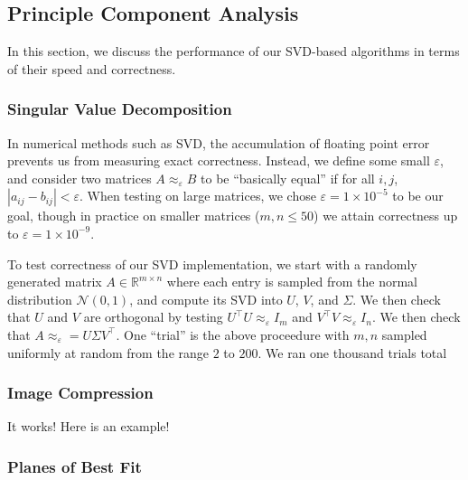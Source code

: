 \documentclass[12pt, letterpaper]{article}
\theoremstyle{definition}
\theoremstyle{remark}
\newcommand{\R}{\mathbb{R}}
\begin{document}
\subsection{Principle Component Analysis}

In this section, we discuss the performance of our SVD-based algorithms in terms 
of their speed and correctness.

\subsubsection{Singular Value Decomposition}

In numerical methods such as SVD, the accumulation of floating point error prevents us from measuring exact correctness.
Instead, we define some small $\varepsilon$, and consider two matrices $A \approx_\varepsilon B$ to be ``basically equal'' if 
for all $i, j$, $|a_{ij} - b_{ij}| < \varepsilon$. When testing on large matrices, we chose $\varepsilon = 1 \times 10^{-5}$
to be our goal, though in practice on smaller matrices ($m, n \leq 50$) we attain correctness up to $\varepsilon = 1 \times 10^{-9}$.

To test correctness of our SVD implementation, we start with a randomly generated matrix $A \in \R^{m \times n}$
where each entry is sampled from the normal distribution $\mathcal N(0, 1)$, and compute its SVD into $U$, $V$, 
and $\Sigma$. We then check that $U$ and $V$ are orthogonal by testing $U^\top U \approx_\varepsilon I_m$ 
and $V^\top V \approx_\varepsilon I_n$. We then check that $A \approx_\varepsilon = U \Sigma V^\top$. One ``trial'' is 
the above proceedure with $m, n$ sampled uniformly at random from the range $2$ to $200$. We ran one thousand trials 
total


\subsubsection{Image Compression}

It works! Here is an example!

\subsubsection{Planes of Best Fit}




\printbibliography
\end{document}
